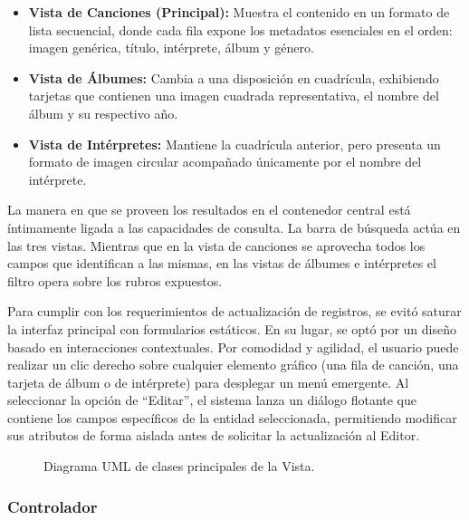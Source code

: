 \documentclass{rep}
\begin{document}
    \begin{itemize}
    \item \textbf{Vista de Canciones (Principal):} Muestra el
      contenido en un formato de lista secuencial, donde cada fila
      expone los metadatos esenciales en el orden: imagen genérica,
      título, intérprete, álbum y género.
    \item \textbf{Vista de Álbumes:} Cambia a una disposición en
      cuadrícula, exhibiendo tarjetas que contienen una imagen
      cuadrada representativa, el nombre del álbum y su respectivo
      año.
    \item \textbf{Vista de Intérpretes:} Mantiene la cuadrícula
      anterior, pero presenta un formato de imagen circular acompañado
      únicamente por el nombre del intérprete.
    \end{itemize}

    La manera en que se proveen los resultados en el contenedor
    central está íntimamente ligada a las capacidades de consulta. La
    barra de búsqueda actúa en las tres vistas. Mientras que en la
    vista de canciones se aprovecha todos los campos que identifican a
    las mismas, en las vistas de álbumes e intérpretes el filtro opera
    sobre los rubros expuestos.

    Para cumplir con los requerimientos de actualización de registros,
    se evitó saturar la interfaz principal con formularios
    estáticos. En su lugar, se optó por un diseño basado en
    interacciones contextuales. Por comodidad y agilidad, el usuario
    puede realizar un clic derecho sobre cualquier elemento gráfico
    (una fila de canción, una tarjeta de álbum o de intérprete) para
    desplegar un menú emergente. Al seleccionar la opción de
    ``Editar'', el sistema lanza un diálogo flotante que contiene los
    campos específicos de la entidad seleccionada, permitiendo
    modificar sus atributos de forma aislada antes de solicitar la
    actualización al Editor.

    \begin{figure}[htbp]
      \centering
        
        \caption{Diagrama UML de clases principales de la Vista.}
        \label{fig:Vista}
    \end{figure}
    
    \subsubsection{Controlador}
\end{document}
